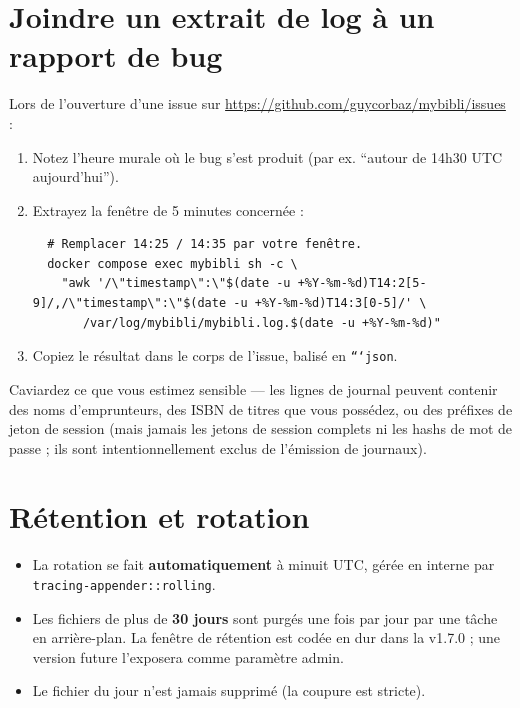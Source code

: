 \section{Joindre un extrait de log à un rapport de bug}

Lors de l'ouverture d'une issue sur
\url{https://github.com/guycorbaz/mybibli/issues} :

\begin{enumerate}
  \item Notez l'heure murale où le bug s'est produit (par ex.
        ``autour de 14h30 UTC aujourd'hui'').
  \item Extrayez la fenêtre de 5 minutes concernée :
  \begin{lstlisting}
  # Remplacer 14:25 / 14:35 par votre fenêtre.
  docker compose exec mybibli sh -c \
    "awk '/\"timestamp\":\"$(date -u +%Y-%m-%d)T14:2[5-9]/,/\"timestamp\":\"$(date -u +%Y-%m-%d)T14:3[0-5]/' \
       /var/log/mybibli/mybibli.log.$(date -u +%Y-%m-%d)"
  \end{lstlisting}
  \item Copiez le résultat dans le corps de l'issue, balisé en
        \texttt{```json}.
\end{enumerate}

Caviardez ce que vous estimez sensible — les lignes de journal
peuvent contenir des noms d'emprunteurs, des ISBN de titres que vous
possédez, ou des préfixes de jeton de session (mais jamais les jetons
de session complets ni les hashs de mot de passe ; ils sont
intentionnellement exclus de l'émission de journaux).

\section{Rétention et rotation}

\begin{itemize}
  \item La rotation se fait \textbf{automatiquement} à minuit UTC,
        gérée en interne par \texttt{tracing-appender::rolling}.
  \item Les fichiers de plus de \textbf{30 jours} sont purgés une
        fois par jour par une tâche en arrière-plan. La fenêtre de
        rétention est codée en dur dans la v1.7.0 ; une version
        future l'exposera comme paramètre admin.
  \item Le fichier du jour n'est jamais supprimé (la coupure est
        stricte).
\end{itemize}

